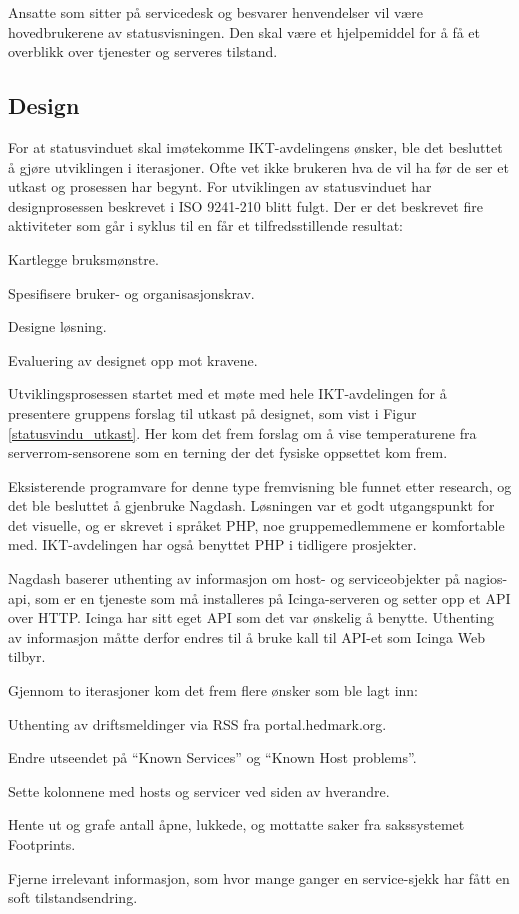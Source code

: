 Ansatte som sitter på servicedesk og besvarer henvendelser vil være hovedbrukerene av statusvisningen. Den skal være et hjelpemiddel for å få et overblikk over tjenester og serveres tilstand.

\subsection{Design}
For at statusvinduet skal imøtekomme IKT-avdelingens ønsker, ble det besluttet å gjøre utviklingen i iterasjoner. Ofte vet ikke brukeren hva de vil ha før de ser et utkast og prosessen har begynt. For utviklingen av statusvinduet har designprosessen beskrevet i ISO 9241-210 blitt fulgt. Der er det beskrevet fire aktiviteter som går i syklus til en får et tilfredsstillende resultat:
\begin{itemize*}
	\item Kartlegge bruksmønstre.
	\item Spesifisere bruker- og organisasjonskrav.
	\item Designe løsning.
	\item Evaluering av designet opp mot kravene.
\end{itemize*}

Utviklingsprosessen startet med et møte med hele IKT-avdelingen for å presentere gruppens forslag til utkast på designet, som vist i Figur \ref{statusvindu_utkast}. Her kom det frem forslag om å vise temperaturene fra serverrom-sensorene som en terning der det fysiske oppsettet kom frem.

Eksisterende programvare for denne type fremvisning ble funnet etter research, og det ble besluttet å gjenbruke Nagdash\cite{nagdash}. Løsningen var et godt utgangspunkt for det visuelle, og er skrevet i språket PHP, noe gruppemedlemmene er komfortable med. IKT-avdelingen har også benyttet PHP i tidligere prosjekter. 

Nagdash baserer uthenting av informasjon om host- og serviceobjekter på nagios-api\cite{nagiosapi}, som er en tjeneste som må installeres på Icinga-serveren og setter opp et API over HTTP. Icinga har sitt eget API som det var ønskelig å benytte. Uthenting av informasjon måtte derfor endres til å bruke kall til API-et som Icinga Web tilbyr\cite{icingarestapi}.

Gjennom to iterasjoner kom det frem flere ønsker som ble lagt inn:
\begin{itemize*}
	 \item Uthenting av driftsmeldinger via RSS fra portal.hedmark.org.
	 \item Endre utseendet på ``Known Services'' og ``Known Host problems''.
	 \item Sette kolonnene med hosts og servicer ved siden av hverandre.
	 \item Hente ut og grafe antall åpne, lukkede, og mottatte saker fra sakssystemet Footprints.
	 \item Fjerne irrelevant informasjon, som hvor mange ganger en service-sjekk har fått en soft tilstandsendring.
\end{itemize*}

